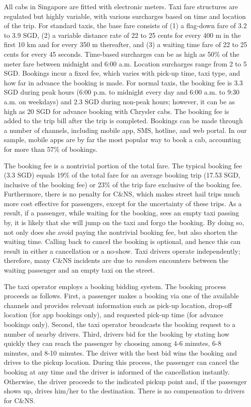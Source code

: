 \documentclass[reviewmode]{restat}
\begin{document}
All cabs in Singapore are fitted with electronic meters. Taxi fare structures are regulated but 
highly variable, with various surcharges based on time and location of the trip. 
For standard taxis, the base fare consists of (1) a flag-down fare of 3.2 to 3.9 SGD, 
(2) a variable distance rate of 22 to 25 cents for every 400 m in the first 10 km and for every 350 m thereafter, 
and (3) a waiting time fare of 22 to 25 cents for every 45 seconds. Time-based surcharges can be as high as 50\% 
of the meter fare between midnight and 6:00 a.m. Location surcharges range from 2 to 5 SGD. Bookings incur a fixed
fee, which varies with pick-up time, taxi type, and how far in advance the booking is made. For normal taxis,
the booking fee is 3.3 SGD during peak hours (6:00 p.m. to midnight every day and 6:00 a.m. to 9:30 a.m. 
on weekdays) and 2.3 SGD during non-peak hours; however, it can be as high as 20 SGD for advance booking
with Chrysler cabs. The booking fee is added to the trip bill after the trip is completed. 
Bookings can be made through a number of channels, including mobile app, SMS, hotline, and web portal.
In our sample, mobile apps are by far the most popular way to book a cab, accounting for more than 57\% of bookings.

The booking fee is a nontrivial portion of the total fare. The typical booking fee (3.3 SGD) equals 19\% 
of the total fare for an average booking trip (17.53 SGD, inclusive of the booking fee) or 23\% of the trip 
fare exclusive of the booking fee. Furthermore, there is no penalty for C\&NS, which makes street hail trips 
much more cost effective for passengers, except for the uncertainty of these trips. 
As a result, if a passenger, while waiting for the booking, sees an empty taxi passing by, 
it is likely that she will jump on the taxi and forgo the booking. By doing so, not only does she avoid
paying the nontrivial booking fee, but also shorten the waiting time. Calling back to cancel the booking is optional,
and hence this can result in either a cancellation or a no-show. Taxi drivers operate independently; 
therefore, many C\&NS incidents are due to \textit{random} encounters between the waiting passenger and an
empty taxi on the street.

The taxi operator employs a booking bidding system. The booking process proceeds as follows. 
First, a passenger makes a booking via one of the available channels and provides relevant information 
such as pick-up location, drop-off location (for app bookings only), and requested pick-up time 
(for advance bookings only). Second, the taxi operator broadcasts the booking request to a number of 
nearby drivers. Third, drivers bid for the booking by stating how quickly they can reach the passenger 
by choosing among 4-6 minutes, 6-8 minutes, and 8-10 minutes. The driver with the best bid wins the
booking and drives to the pickup location. During this process, the passenger can cancel the booking
at any time and the driver is informed of the cancellation instantly. Otherwise, the driver proceeds
to the indicated pickup point and, if the passenger shows up, drives him/her to the destination. 
There is no compensation to drivers for C\&NS.
\end{document}
